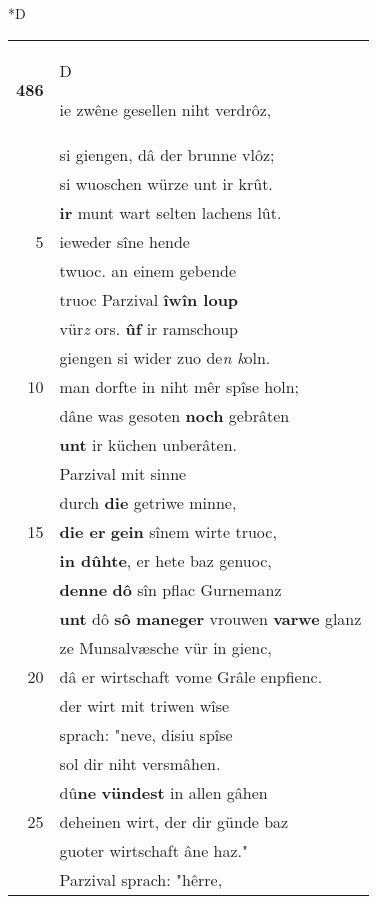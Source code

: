 \documentclass[8pt,a4paper,notitlepage]{article}
\begin{document}
\begin{table}[ht]
\begin{minipage}[t]{0.5\linewidth}
\small
\begin{center}*D
\end{center}
\begin{tabular}{rl}
\textbf{486} & \begin{large}D\end{large}ie zwêne gesellen niht verdrôz,\\ 
 & si giengen, dâ der brunne vlôz;\\ 
 & si wuoschen würze unt ir krût.\\ 
 & \textbf{ir} munt wart selten lachens lût.\\ 
5 & ieweder sîne hende\\ 
 & twuoc. an einem gebende\\ 
 & truoc Parzival \textbf{îwîn loup}\\ 
 & vür\textit{z} ors. \textbf{ûf} ir ramschoup\\ 
 & giengen si wider zuo de\textit{n k}oln.\\ 
10 & man dorfte in niht mêr spîse holn;\\ 
 & dâne was gesoten \textbf{noch} gebrâten\\ 
 & \textbf{unt} ir küchen unberâten.\\ 
 & Parzival mit sinne\\ 
 & durch \textbf{die} getriwe minne,\\ 
15 & \textbf{die er} \textbf{gein} sînem wirte truoc,\\ 
 & \textbf{in dûhte}, er hete baz genuoc,\\ 
 & \textbf{denne} \textbf{dô} sîn pflac Gurnemanz\\ 
 & \textbf{unt} dô \textbf{sô} \textbf{maneger} vrouwen \textbf{varwe} glanz\\ 
 & ze Munsalvæsche vür in gienc,\\ 
20 & dâ er wirtschaft vome Grâle enpfienc.\\ 
 & der wirt mit triwen wîse\\ 
 & sprach: "neve, disiu spîse\\ 
 & sol dir niht versmâhen.\\ 
 & dû\textbf{ne} \textbf{vündest} in allen gâhen\\ 
25 & deheinen wirt, der dir günde baz\\ 
 & guoter wirtschaft âne haz."\\ 
 & Parzival sprach: "hêrre,\\ 

\end{tabular}
\end{minipage}
\end{table}
\end{document}
